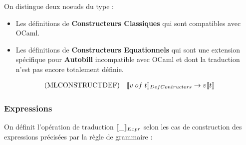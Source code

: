 \documentclass[12pt]{article}
\begin{document}
On distingue deux noeuds du type :
\begin{itemize}
      \tightlist
      \item
            Les définitions de \textbf{Constructeurs Classiques} qui sont compatibles avec OCaml.
      \item
            Les définitions de \textbf{Constructeurs Equationnels} qui sont une extension spécifique pour \textbf{Autobill} incompatible avec OCaml et dont la traduction n'est pas encore totalement définie.
\end{itemize}
\begin{align*}
      \text{(MLCONSTRUCTDEF)} \quad & \llbracket v \; of \; t \rrbracket_{DefContructors}   \rightarrow   v\llbracket t \rrbracket \\
\end{align*}

\subsubsection*{Expressions}\label{exprs}

On définit l'opération de traduction \(\llbracket \_ \rrbracket_{Expr}\) selon les cas de construction
des expressions précisées par la règle de grammaire : 
\end{document}
